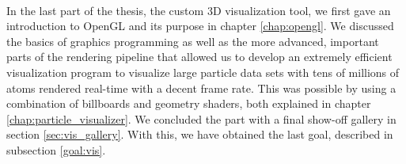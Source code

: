 \\
In the last part of the thesis, the custom 3D visualization tool, we first gave an introduction to OpenGL and its purpose in chapter \ref{chap:opengl}. We discussed the basics of graphics programming as well as the more advanced, important parts of the rendering pipeline that allowed us to develop an extremely efficient visualization program to visualize large particle data sets with tens of millions of atoms rendered real-time with a decent frame rate. This was possible by using a combination of billboards and geometry shaders, both explained in chapter \ref{chap:particle_visualizer}. We concluded the part with a final show-off gallery in section \ref{sec:vis_gallery}. With this, we have obtained the last goal, described in subsection \ref{goal:vis}. 